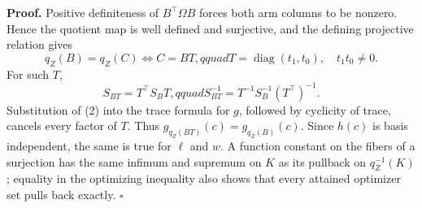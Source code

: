 \textbf{Proof.}
Positive definiteness of \(B^{\top}\Omega B\) forces both arm columns to be nonzero.  Hence the quotient map is well defined and surjective, and the defining projective relation gives
\[
q_Z(B)=q_Z(C)
\Longleftrightarrow
C=BT,qquad T=\operatorname{diag}(t_1,t_0),\quad t_1t_0\ne0.
\tag{1}
\]
For such \(T\),
\[
 S_{BT}=T^{\top}S_BT,qquad
 S_{BT}^{-1}=T^{-1}S_B^{-1}(T^{\top})^{-1}.
\tag{2}
\]
Substitution of (2) into the trace formula for \(g\), followed by cyclicity of trace, cancels every factor of \(T\).  Thus \(g_{q_Z(BT)}(c)=g_{q_Z(B)}(c)\).  Since \(h(c)\) is basis independent, the same is true for \(\ell\) and \(w\).  A function constant on the fibers of a surjection has the same infimum and supremum on \(K\) as its pullback on \(q_Z^{-1}(K)\); equality in the optimizing inequality also shows that every attained optimizer set pulls back exactly. \(\square\)